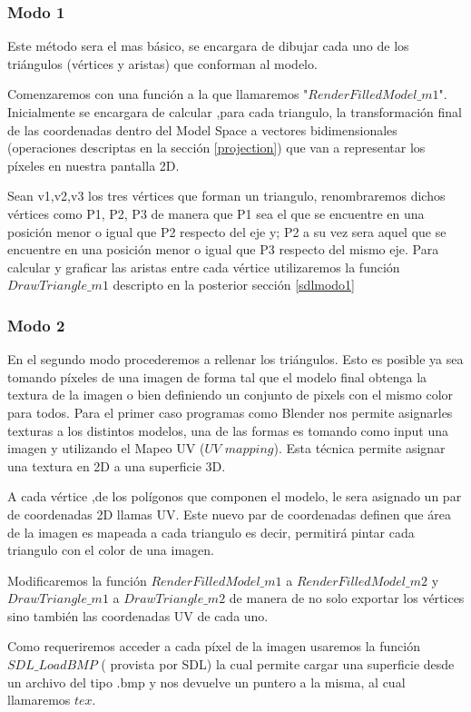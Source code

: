 \documentclass[a4paper]{article}
\newcounter{col}
\begin{document}
\subsubsection{Modo 1}  
Este método sera el mas básico, se encargara de dibujar cada uno de los triángulos (vértices y aristas) que conforman al modelo. 
\par Comenzaremos con una función a la que llamaremos "$RenderFilledModel\_m1$". Inicialmente se encargara de calcular ,para cada triangulo, la transformación final de las coordenadas dentro del Model Space a vectores bidimensionales (operaciones descriptas en la sección \ref{projection}) que van a representar los píxeles en nuestra pantalla 2D.  
\par Sean v1,v2,v3 los tres vértices que forman un triangulo, renombraremos dichos vértices como P1, P2, P3 de manera que P1 sea el que se encuentre en una posición menor o igual que P2 respecto del eje y;  P2 a su vez sera aquel que se encuentre en una posición menor o igual que P3 respecto del mismo eje. Para calcular y graficar las aristas entre cada vértice utilizaremos la función $DrawTriangle\_m1$ descripto en la posterior sección \ref{sdlmodo1} 


\subsubsection{Modo 2}  
En el segundo modo procederemos a rellenar los triángulos. Esto es posible ya sea tomando píxeles de una imagen de forma tal que el modelo final obtenga la textura de la imagen o bien definiendo un conjunto de pixels con el mismo color para todos. Para el primer caso programas como Blender nos permite asignarles texturas a los distintos modelos, una de las formas es tomando como input una imagen y utilizando el Mapeo UV ($UV$ $mapping$). Esta técnica permite asignar una textura en 2D a una superficie 3D. 
\par A cada vértice ,de los polígonos que componen el modelo, le sera asignado un par de coordenadas 2D llamas UV. Este nuevo par de coordenadas definen que área de la imagen es mapeada a cada triangulo es decir, permitirá pintar cada triangulo con el color de una imagen. 
\par Modificaremos la función $RenderFilledModel\_m1$ a $RenderFilledModel\_m2$ y $DrawTriangle\_m1$ a $DrawTriangle\_m2$ de manera de no solo exportar los vértices sino también las coordenadas UV de cada uno.
\par Como requeriremos acceder a cada píxel de la imagen usaremos la función $SDL\_LoadBMP$ ( provista por SDL) la cual permite cargar una superficie desde un archivo del tipo .bmp y nos devuelve un puntero a la misma, al cual llamaremos $tex$.
\end{document}
